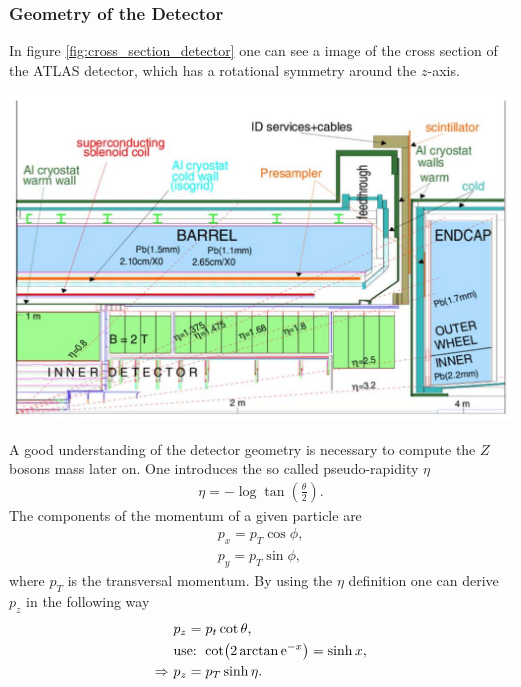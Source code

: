 \documentclass[12pt, a4paper, bibliography=totoc]{scrartcl}
\begin{document}
\begin{multicols}{2}
\subsubsection{Geometry of the Detector}
In figure \ref{fig:cross_section_detector} one can see a image of the cross section of the ATLAS detector, which has a rotational symmetry around the $z$-axis.
\begin{center}
	\includegraphics[width=0.8\linewidth]{fig/detector_geometry.png}
	\label{fig:cross_section_detector}
\end{center}
A good understanding of the detector geometry is necessary to compute the $Z$ bosons mass later on. 
One introduces the so called pseudo-rapidity $\eta$
\begin{align}
    \eta = - \log \tan \left( \frac{\theta}{2} \right).
\end{align}
The components of the momentum of a given particle are
\begin{align}
    p_x = p_T \cos \phi , \\
    p_y = p_T \sin \phi ,
\end{align}
where $p_T$ is the transversal momentum.
By using the $\eta$ definition one can derive $p_z$ in the following way
\begin{align}
    & p_z = p_t \cot \theta , \\
    & \text{use: } \cot (2\arctan \mathrm{e}^{-x}) = \sinh x , \\
    \Rightarrow \ & p_z = p_T \sinh \eta .
\end{align}


\end{multicols}
\end{document}
